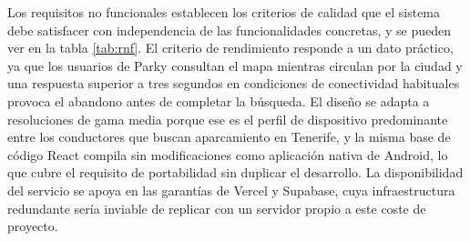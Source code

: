 Los requisitos no funcionales establecen los criterios de calidad que el sistema debe satisfacer con independencia de las funcionalidades concretas, y se pueden ver en la tabla \ref{tab:rnf}. El criterio de rendimiento responde a un dato práctico, ya que los usuarios de Parky consultan el mapa mientras circulan por la ciudad y una respuesta superior a tres segundos en condiciones de conectividad habituales provoca el abandono antes de completar la búsqueda. El diseño se adapta a resoluciones de gama media porque ese es el perfil de dispositivo predominante entre los conductores que buscan aparcamiento en Tenerife, y la misma base de código React compila sin modificaciones como aplicación nativa de Android, lo que cubre el requisito de portabilidad sin duplicar el desarrollo. La disponibilidad del servicio se apoya en las garantías de Vercel y Supabase, cuya infraestructura redundante sería inviable de replicar con un servidor propio a este coste de proyecto.

